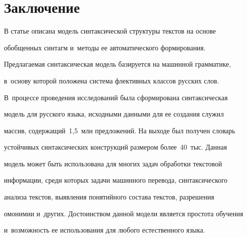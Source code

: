     \section{Заключение}

     

  В статье описана модель синтаксической структуры текстов на основе 

обобщенных синтагм и~методы ее автоматического формирования. 

Предлагаемая синтаксическая модель базируется на машинной грамматике, 

в~основу которой положена система флективных классов русских слов. 

В~процессе проведения исследований была сформирована синтаксическая 

модель для русского языка, исходными данными для ее создания служил 

массив, содержащий~1,5~млн предложений. На выходе был получен словарь 

устойчивых синтаксических конструкций размером более~40~тыс. Данная 

модель может быть использована для многих задач обработки текстовой 

информации, среди которых задачи машинного перевода, синтаксического 

анализа текстов, выявления понятийного состава текстов, разрешения 

омонимии и~других. Достоинством данной модели является простота обучения 

и~возможность ее использования для любого естественного языка.

  


